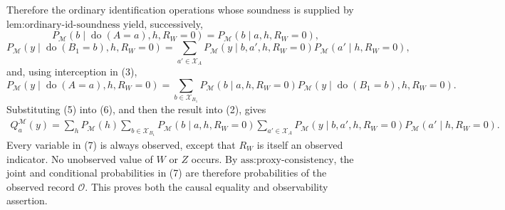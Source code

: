 Therefore the ordinary identification operations whose soundness is supplied by \(\text{lem:ordinary-id-soundness}\) yield, successively,
\[
P_{\mathcal M}(b\mid\operatorname{do}(A=a),h,R_W=0)
=P_{\mathcal M}(b\mid a,h,R_W=0),
\tag{4}
\]
\[
P_{\mathcal M}(y\mid\operatorname{do}(B_1=b),h,R_W=0)
=\sum_{a'\in\mathcal X_A}
P_{\mathcal M}(y\mid b,a',h,R_W=0)
P_{\mathcal M}(a'\mid h,R_W=0),
\tag{5}
\]
and, using interception in (3),
\[
P_{\mathcal M}(y\mid\operatorname{do}(A=a),h,R_W=0)
=\sum_{b\in\mathcal X_{B_1}}
P_{\mathcal M}(b\mid a,h,R_W=0)
P_{\mathcal M}(y\mid\operatorname{do}(B_1=b),h,R_W=0).
\tag{6}
\]
Substituting (5) into (6), and then the result into (2), gives
\[
\begin{aligned}
Q_a^{\mathcal M}(y)
=\sum_hP_{\mathcal M}(h)
\sum_{b\in\mathcal X_{B_1}}P_{\mathcal M}(b\mid a,h,R_W=0)
\sum_{a'\in\mathcal X_A}
P_{\mathcal M}(y\mid b,a',h,R_W=0)
P_{\mathcal M}(a'\mid h,R_W=0).
\end{aligned}
\tag{7}
\]
Every variable in (7) is always observed, except that \(R_W\) is itself an observed indicator.  No unobserved value of \(W\) or \(Z\) occurs.  By \(\text{ass:proxy-consistency}\), the joint and conditional probabilities in (7) are therefore probabilities of the observed record \(\mathcal O\).  This proves both the causal equality and observability assertion.